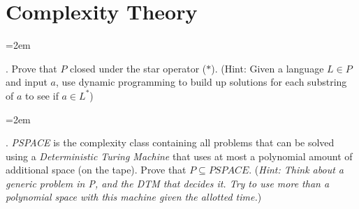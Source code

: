 \documentclass[12pt]{article}
\def\homework{Complexity Theory}
\newcounter{quesnum}
\newcommand{\question}[2][??]{
\begin{list}{\labelitemi}{\leftmargin=2em}
\item [\arabic{quesnum}.] {} {#2}
\end{list}
\addtocounter{quesnum}{1}
}
\begin{document}
\section*{\homework}


\question[3]{
Prove that $P$ closed under the star operator ($*$). (Hint: Given a language $L \in P$ and input $a$, use dynamic programming to build up solutions for each substring of $a$ to see if $a \in L^*$)
}

\vspace{12pt}



\question[3]{
\emph{PSPACE} is the complexity class containing all problems that can be solved using a \emph{Deterministic Turing Machine} that uses at most a polynomial amount of additional space (on the tape). Prove that $P \subseteq \textit{PSPACE}$. (\emph{Hint: Think about a generic problem in P, and the DTM that decides it. Try to use more than a polynomial space with this machine given the allotted time.})
}


\vspace{12pt}
\end{document}
